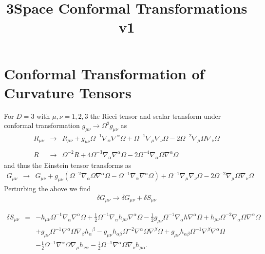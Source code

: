 \documentclass[10pt,letterpaper]{article}
\title{3Space Conformal Transformations v1}
\date{}
\numberwithin{equation}{section}
\begin{document}
 
\maketitle
\noindent 
\section{Conformal Transformation of Curvature Tensors}
For $D=3$ with $\mu,\nu = 1,2,3$ the Ricci tensor and scalar transform under conformal transformation $g_{\mu\nu} \to \Omega^2 g_{\mu\nu}$ as
\begin{eqnarray}
R_{\mu\nu} &\to& R_{\mu \nu} + g_{\mu \nu} \Omega^{-1} \nabla_{\alpha}\nabla^{\alpha}\Omega +  \Omega^{-1} \nabla_{\mu}\nabla_{\nu}\Omega - 2 \Omega^{-2} \nabla_{\mu}\Omega \nabla_{\nu}\Omega
\nonumber\\ \nonumber\\
R &\to&  \Omega^{-2}R + 4 \Omega^{-3} \nabla_{\alpha}\nabla^{\alpha}\Omega - 2 \Omega^{-4} \nabla_{\alpha}\Omega \nabla^{\alpha}\Omega
\end{eqnarray}
and thus the Einstein tensor transforms as
\begin{eqnarray}
G_{\mu\nu} &\to& G_{\mu\nu} +  g_{\mu \nu}( \Omega^{-2} \nabla_{\alpha}\Omega \nabla^{\alpha}\Omega -\Omega^{-1} \nabla_{\alpha}\nabla^{\alpha}\Omega)+  \Omega^{-1} \nabla_{\mu}\nabla_{\nu}\Omega - 2 \Omega^{-2} \nabla_{\mu}\Omega \nabla_{\nu}\Omega
\label{gbg}
\end{eqnarray}
Perturbing the above we find
\begin{eqnarray}
\delta G_{\mu\nu} \to \delta G_{\mu\nu} + \delta S_{\mu\nu}
\label{dgds}
\end{eqnarray}

\begin{eqnarray}
\delta S_{\mu\nu} &=&- h_{\mu \nu} \Omega^{-1} \nabla_{\alpha}\nabla^{\alpha}\Omega
 + \tfrac{1}{2} \Omega^{-1} \nabla_{\alpha}h_{\mu \nu} \nabla^{\alpha}\Omega
 -  \tfrac{1}{2} g_{\mu \nu} \Omega^{-1} \nabla_{\alpha}h \nabla^{\alpha}\Omega
 + h_{\mu \nu} \Omega^{-2} \nabla_{\alpha}\Omega \nabla^{\alpha}\Omega\nonumber\\
&& + g_{\mu \nu} \Omega^{-1} \nabla^{\alpha}\Omega \nabla_{\beta}h_{\alpha}{}^{\beta}
 -  g_{\mu \nu} h_{\alpha \beta} \Omega^{-2} \nabla^{\alpha}\Omega \nabla^{\beta}\Omega
 + g_{\mu \nu} h_{\alpha \beta} \Omega^{-1} \nabla^{\beta}\nabla^{\alpha}\Omega\nonumber\\
&& -  \tfrac{1}{2} \Omega^{-1} \nabla^{\alpha}\Omega \nabla_{\mu}h_{\nu \alpha}
 -  \tfrac{1}{2} \Omega^{-1} \nabla^{\alpha}\Omega \nabla_{\nu}h_{\mu \alpha}.
\label{ds}
\end{eqnarray}
\end{document}
